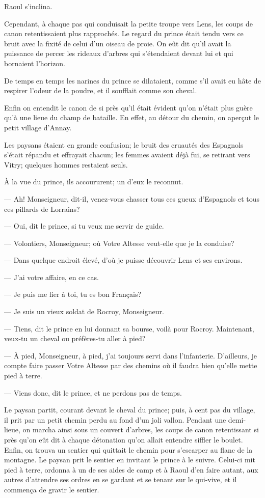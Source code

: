 Raoul s'inclina.

Cependant, à chaque pas qui conduisait la petite troupe vers Lens, les coups de canon retentissaient plus rapprochés. Le regard du prince était tendu vers ce bruit avec la fixité de celui d'un oiseau de proie. On eût dit qu'il avait la puissance de percer les rideaux d'arbres qui s'étendaient devant lui et qui bornaient l'horizon.

De temps en temps les narines du prince se dilataient, comme s'il avait eu hâte de respirer l'odeur de la poudre, et il soufflait comme son cheval.

Enfin on entendit le canon de si près qu'il était évident qu'on n'était plus guère qu'à une lieue du champ de bataille. En effet, au détour du chemin, on aperçut le petit village d'Annay.

Les paysans étaient en grande confusion; le bruit des cruautés des Espagnols s'était répandu et effrayait chacun; les femmes avaient déjà fui, se retirant vers Vitry; quelques hommes restaient seuls.

À la vue du prince, ils accoururent; un d'eux le reconnut.

— Ah! Monseigneur, dit-il, venez-vous chasser tous ces gueux d'Espagnols et tous ces pillards de Lorrains?

— Oui, dit le prince, si tu veux me servir de guide.

— Volontiers, Monseigneur; où Votre Altesse veut-elle que je la conduise?

— Dans quelque endroit élevé, d'où je puisse découvrir Lens et ses environs.

— J'ai votre affaire, en ce cas.

— Je puis me fier à toi, tu es bon Français?

— Je suis un vieux soldat de Rocroy, Monseigneur.

— Tiens, dit le prince en lui donnant sa bourse, voilà pour Rocroy. Maintenant, veux-tu un cheval ou préfères-tu aller à pied?

— À pied, Monseigneur, à pied, j'ai toujours servi dans l'infanterie. D'ailleurs, je compte faire passer Votre Altesse par des chemins où il faudra bien qu'elle mette pied à terre.

— Viens donc, dit le prince, et ne perdons pas de temps.

Le paysan partit, courant devant le cheval du prince; puis, à cent pas du village, il prit par un petit chemin perdu au fond d'un joli vallon. Pendant une demi-lieue, on marcha ainsi sous un couvert d'arbres, les coups de canon retentissant si près qu'on eût dit à chaque détonation qu'on allait entendre siffler le boulet. Enfin, on trouva un sentier qui quittait le chemin pour s'escarper au flanc de la montagne. Le paysan prit le sentier en invitant le prince à le suivre. Celui-ci mit pied à terre, ordonna à un de ses aides de camp et à Raoul d'en faire autant, aux autres d'attendre ses ordres en se gardant et se tenant sur le qui-vive, et il commença de gravir le sentier.

